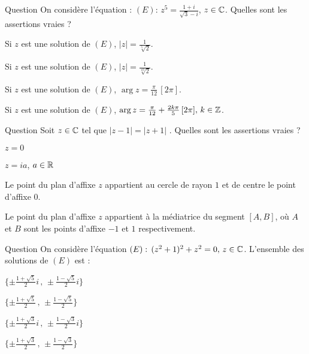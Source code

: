 \begin{multi}[multiple,feedback=
{Résoudre \( z^5= \frac{1+i}{\sqrt 3-i}= \frac{1}{\sqrt 2} e^{i\frac{5\pi}{12}}\), en utilisant l'écriture géométrique.
}]{Question}
On considère l'équation : \((E) : \, z^5= \frac{1+i}{\sqrt 3-i}\), \(z\in \mathbb{C}\).   Quelles sont les assertions vraies ?

    \item Si \(z\) est une solution de \((E)\), \(|z|=\frac{1}{\sqrt[5]{ 2}}\).
    \item* Si \(z\) est une solution de \((E)\), \(|z|=\frac{1}{\sqrt[10] 2}\).
    \item Si \(z\) est une solution de \((E)\), \(\arg z=\frac{\pi}{12} \, [2\pi]\).
    \item* Si \(z\) est une solution de \((E)\), \(\arg z=\frac{\pi}{12} + \frac{2k\pi}{5} \, [2\pi], \, k \in \mathbb{Z}\).
\end{multi}


\begin{multi}[multiple,feedback=
{Soit \(z\) tel que \(|z-1|=|z+1|\), \(M\) le point du plan d'affixe \(z\),  \(A\) et \(B\) les points d'affixe \(-1\) et \(1\)
respectivement. Alors, \(M\) est équidistant de \(A\) et \(B\).
}]{Question}
Soit \(z\in \mathbb{C}\) tel que \(|z-1|=|z+1|\) .  Quelles sont les assertions vraies ?

    \item \(z=0\)
    \item* \(z=ia\), \(a\in \mathbb{R}\)
    \item Le point du plan d'affixe \(z\) appartient au cercle de rayon \(1\) et de centre le point d'affixe \(0\).
    \item* Le point du plan d'affixe \(z\) appartient à la médiatrice du segment \([A,B]\), où \(A\) et \(B\) sont les points d'affixe \(-1\) et \(1\) respectivement.
\end{multi}


\begin{multi}[multiple,feedback=
{Remarquer que \((z^2+1)^2+z^2= (z^2+1)^2 - (iz)^2= (z^2-iz+1)(z^2+iz+1)\). On peut aussi poser \(Z=z^2\) et se ramener à une équation du second degré.
}]{Question}
On considère l'équation \((E) :  \, (z^2+1)^2+z^2=0, \, z\in \mathbb{C}\). L'ensemble des solutions de \((E)\) est :

    \item* \(\{ \pm \frac{1+\sqrt5}{2}i \, ,\,  \pm \frac{1-\sqrt5}{2}i\}\)
    \item \(\{\pm \frac{1+\sqrt5}{2} \, , \,  \pm \frac{1-\sqrt5}{2}\}\)
    \item \(\{\pm \frac{1+\sqrt3}{2}i \, , \,  \pm \frac{1-\sqrt3}{2}i\}\)
    \item \(\{\pm \frac{1+\sqrt3}{2} \, , \,  \pm \frac{1-\sqrt3}{2}\}\)
\end{multi}


